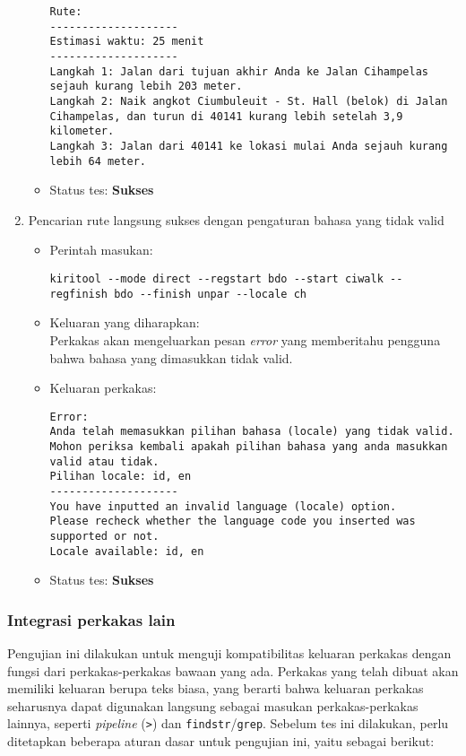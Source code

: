 \begin{enumerate}
\begin{itemize}
\begin{lstlisting}
Rute:
--------------------
Estimasi waktu: 25 menit
--------------------
Langkah 1: Jalan dari tujuan akhir Anda ke Jalan Cihampelas sejauh kurang lebih 203 meter.
Langkah 2: Naik angkot Ciumbuleuit - St. Hall (belok) di Jalan Cihampelas, dan turun di 40141 kurang lebih setelah 3,9 kilometer.
Langkah 3: Jalan dari 40141 ke lokasi mulai Anda sejauh kurang lebih 64 meter.
		\end{lstlisting}
		\item Status tes: \textbf{Sukses}
	\end{itemize}
	
	\item Pencarian rute langsung sukses dengan pengaturan bahasa yang tidak valid
	\begin{itemize}
		\item Perintah masukan:
		\begin{lstlisting}
kiritool --mode direct --regstart bdo --start ciwalk --regfinish bdo --finish unpar --locale ch
		\end{lstlisting}
		\item Keluaran yang diharapkan: \\
		Perkakas akan mengeluarkan pesan \textit{error} yang memberitahu pengguna bahwa bahasa yang dimasukkan tidak valid.
		\item Keluaran perkakas:
		\begin{lstlisting}
Error:
Anda telah memasukkan pilihan bahasa (locale) yang tidak valid.
Mohon periksa kembali apakah pilihan bahasa yang anda masukkan valid atau tidak.
Pilihan locale: id, en
--------------------
You have inputted an invalid language (locale) option.
Please recheck whether the language code you inserted was supported or not.
Locale available: id, en
		\end{lstlisting}
		\item Status tes: \textbf{Sukses}
	\end{itemize}
	
\end{enumerate}

\subsubsection{Integrasi perkakas \cl\xspace lain}
\label{sec:testing-experiments-testing-integration}

Pengujian ini dilakukan untuk menguji kompatibilitas keluaran perkakas dengan fungsi dari perkakas-perkakas \cl\xspace bawaan yang ada. Perkakas yang telah dibuat akan memiliki keluaran berupa teks biasa, yang berarti bahwa keluaran perkakas seharusnya dapat digunakan langsung sebagai masukan perkakas-perkakas \cl\xspace lainnya, seperti \textit{pipeline} (\verb|>|) dan \verb|findstr|/\verb|grep|. Sebelum tes ini dilakukan, perlu ditetapkan beberapa aturan dasar untuk pengujian ini, yaitu sebagai berikut:

